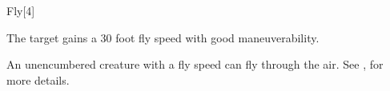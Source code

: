 \begin{spellsection}{Fly}[4]
    \begin{spellheader}
    \end{spellheader}
    \begin{spellcontent}
        \begin{spelltargetinginfo}
        \end{spelltargetinginfo}
        \begin{spelleffects}
            \spelleffect The target gains a 30 foot fly speed with good maneuverability.
            \spelldur \durshort
        \end{spelleffects}
    \end{spellcontent}
    \begin{spellfooter}
        \spellnotes An unencumbered creature with a fly speed can fly through the air. See , for more details.
        \miscastexplode
    \end{spellfooter}
    \begin{spellaugments}
    \end{spellaugments}
\end{spellsection}

